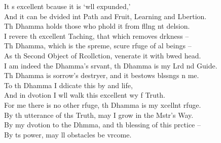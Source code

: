 \begin{leader}
\end{leader}

It s excellent bcause it is `wll expunded,'\\
And it can be dvided int Path and Fruit, Learning and Lbertion.\\
Th Dhamma holds those who phold it from fllng nt delsion.\\
I revere th excellent Taching, that which removes drkness --\\
Th Dhamma, which is the spreme, scure rfuge of al beings --\\
As th Second Object of Rcollction,  venerate it with bwed head.\\
I am indeed the Dhamma's srvant, th Dhamma is my Lrd nd Guide.\\
Th Dhamma is sorrow's destryer, and it bestows blssngs n me.\\
To th Dhamma I ddicate this by and life,\\
And in dvotion I wll walk this excellent wy f Truth.\\
For me there is no other rfuge, th Dhamma is my xcellnt rfuge.\\
By th utterance of ths Truth, may I grow in the Mstr's Way.\\
By my dvotion to the Dhmma, and th blessing of this prctice --\\
By ts power, may ll obstacles be vrcome.

\clearpage

